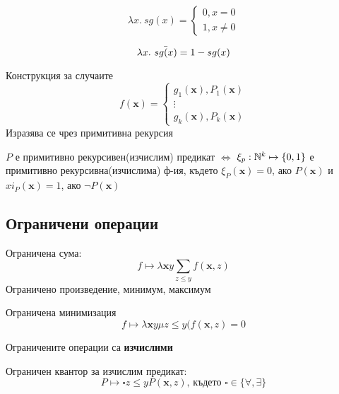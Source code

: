 \begin{example}
    \begin{equation*}
        \lambda x.\ sg(x) = \begin{cases}
            0, x = \text{0} \\
            1, x \neq \text{0}
        \end{cases}
    \end{equation*}
\end{example}
\begin{example}
    \begin{equation*}
           \lambda x.\ \Bar{sg(x)} = 1 - sg(x)
    \end{equation*}
\end{example}

Конструкция за случаите
\begin{equation}
    f(\textbf{x}) = \begin{cases}
        g_1(\textbf{x}), P_1(\textbf{x}) \\
        \vdots \\
        g_k(\textbf{x}), P_k(\textbf{x})
    \end{cases}
\end{equation}
Изразява се чрез примитивна рекурсия

\begin{definition}
    $P$ е примитивно рекурсивен(изчислим) предикат $\iff$ $\xi_p: {\mathbb{N}}^k \mapsto \{0, 1\}$ е примитивно рекурсивна(изчислима) ф-ия, където $\xi_P(\textbf{x}) = 0$, ако $P(\textbf{x})$ и $xi_P(\textbf{x}) = 1$, ако $\neg P(\textbf{x})$ 
\end{definition}

\subsection{Ограничени операции}
Ограничена сума:
\begin{equation}
    f \mapsto \lambda \textbf{x}y \sum\limits_{z \leq y} f(\textbf{x}, z)
\end{equation}
Ограничено произведение, минимум, максимум

Ограничена минимизация
\begin{equation}
    f \mapsto \lambda \textbf{x}y \mu z \leq y (f(\textbf{x}, z) = 0
\end{equation}

Ограничените операции са \textbf{изчислими}

Ограничен квантор за изчислим предикат:
\begin{equation}
    P \mapsto \square z \leq y P(\textbf{x}, z) \text{, където } \square \in \{\forall, \exists\}
\end{equation}

